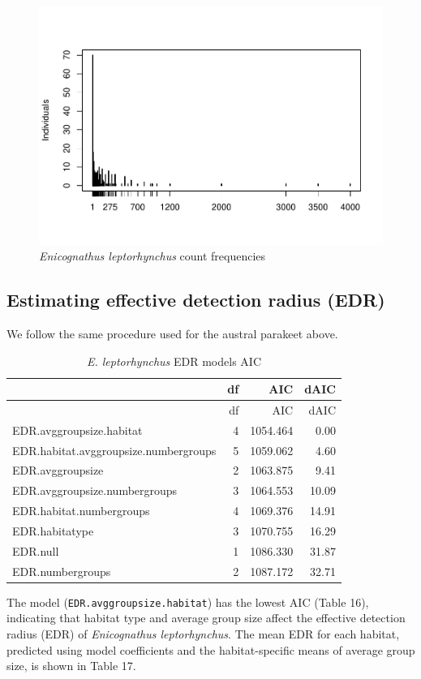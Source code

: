 \documentclass[]{article}
\begin{document}
\begin{figure}[H]
\includegraphics{Patagonia_parrots_density_analysis_files/figure-latex/unnamed-chunk-21-1} \caption{\textit{Enicognathus leptorhynchus} count frequencies}\label{fig:unnamed-chunk-21}
\end{figure}

\subsection{Estimating effective detection radius
(EDR)}\label{estimating-effective-detection-radius-edr-1}

We follow the same procedure used for the austral parakeet above.

\begin{longtable}[]{@{}lrrr@{}}
\caption{\textit{E. leptorhynchus} EDR models AIC}\tabularnewline
\toprule
& df & AIC & dAIC\tabularnewline
\midrule
\endfirsthead
\toprule
& df & AIC & dAIC\tabularnewline
\midrule
\endhead
EDR.avggroupsize.habitat & 4 & 1054.464 & 0.00\tabularnewline
EDR.habitat.avggroupsize.numbergroups & 5 & 1059.062 &
4.60\tabularnewline
EDR.avggroupsize & 2 & 1063.875 & 9.41\tabularnewline
EDR.avggroupsize.numbergroups & 3 & 1064.553 & 10.09\tabularnewline
EDR.habitat.numbergroups & 4 & 1069.376 & 14.91\tabularnewline
EDR.habitatype & 3 & 1070.755 & 16.29\tabularnewline
EDR.null & 1 & 1086.330 & 31.87\tabularnewline
EDR.numbergroups & 2 & 1087.172 & 32.71\tabularnewline
\bottomrule
\end{longtable}

The model (\texttt{EDR.avggroupsize.habitat}) has the lowest AIC (Table
16), indicating that habitat type and average group size affect the
effective detection radius (EDR) of \emph{Enicognathus leptorhynchus}.
The mean EDR for each habitat, predicted using model coefficients and
the habitat-specific means of average group size, is shown in Table 17.
\end{document}
